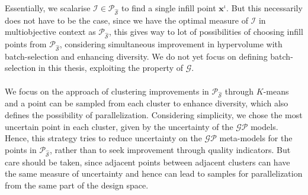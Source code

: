 Essentially, we scalarise $\mathscr{I} \in \mathscr{P}_{\hat{\mathcal S}}$ to find a single infill point $\bm x^{\iota}$. But this necessarily does not have to be the case, since we have the optimal measure of $\mathscr{I}$ in multiobjective context as $\mathscr{P}_{\hat{\mathcal S}}$, this gives way to lot of possibilities of choosing infill points from $\mathscr{P}_{\hat{\mathcal S}}$, considering simultaneous improvement in hypervolume with batch-selection and enhancing diversity.
 We do not yet focus on defining batch-selection in this thesis, exploiting the property of $\mathscr{G}$.\\



\\

We focus on the approach of clustering improvements in $\mathscr{P}_{\hat{\mathcal{S}}}$ through $K$-means and a point can be sampled from each cluster to enhance diversity, which also defines the possibility of parallelization. 
Considering simplicity, we chose the most uncertain point in each cluster, given by the uncertainty of the $\mathcal{GP}$ models. Hence, this strategy tries to reduce uncertainty on the $\mathcal{GP}$ meta-models for the points in $\mathscr{P}_{\hat{\mathcal{S}}}$, rather than to seek improvement through quality indicators. But care should be taken, since adjacent points between adjacent clusters can have the same measure of uncertainty and hence can lead to samples for parallelization from the same part of the design space.\\

